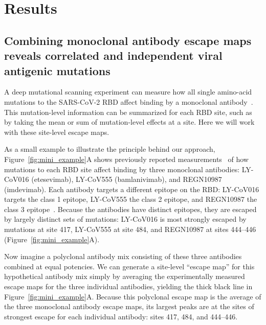 \documentclass[9pt,twocolumn,twoside]{gsajnl_modified}
\begin{document}
\section{Results}

\subsection{Combining monoclonal antibody escape maps reveals correlated and independent viral antigenic mutations}
A deep mutational scanning experiment can measure how all single amino-acid mutations to the SARS-CoV-2 RBD affect binding by a monoclonal antibody~\citep{greaney2021complete}.
This mutation-level information can be summarized for each RBD site, such as by taking the mean or sum of mutation-level effects at a site.
Here we will work with these site-level escape maps.

As a small example to illustrate the principle behind our approach, Figure~\ref{fig:mini_example}A shows previously reported measurements~\citep{starr2021prospective, starr2021complete} of how mutations to each RBD site affect binding by three monoclonal antibodies: LY-CoV016 (etesevimab), LY-CoV555 (bamlanivimab), and REGN10987 (imdevimab).
Each antibody targets a different epitope on the RBD: LY-CoV016 targets the class 1 epitope, LY-CoV555 the class 2 epitope, and REGN10987 the class 3 epitope~\citep{barnes2020sars,greaney2021mapping}.
Because the antibodies have distinct epitopes, they are escaped by largely distinct sets of mutations: LY-CoV016 is most strongly escaped by mutations at site 417, LY-CoV555 at site 484, and REGN10987 at sites 444--446 (Figure~\ref{fig:mini_example}A).

Now imagine a polyclonal antibody mix consisting of these three antibodies combined at equal potencies.
We can generate a site-level ``escape map'' for this hypothetical antibody mix simply by averaging the experimentally measured escape maps for the three individual antibodies, yielding the thick black line in Figure~\ref{fig:mini_example}A.
Because this polyclonal escape map is the average of the three monoclonal antibody escape maps, its largest peaks are at the sites of strongest escape for each individual antibody: sites 417, 484, and 444--446.
\end{document}
